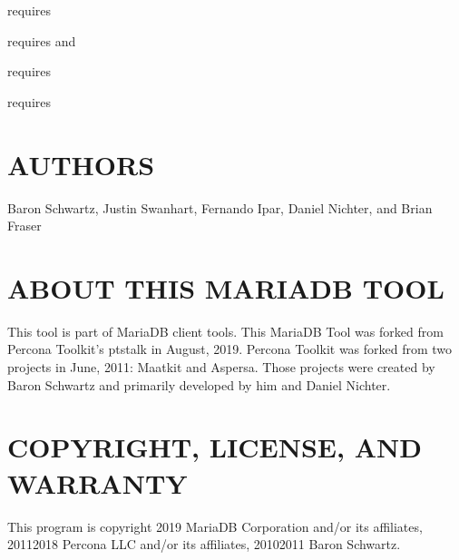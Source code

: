 \documentclass[letterpaper,10pt,english]{sphinxmanual}
\begin{document}
\sphinxAtStartPar
{\hyperref[\detokenize{mariadb-stat:cmdoption-mariadb-stat-collect-gdb}]{}} requires 

\sphinxAtStartPar
{\hyperref[\detokenize{mariadb-stat:cmdoption-mariadb-stat-collect-oprofile}]{}} requires  and 

\sphinxAtStartPar
{\hyperref[\detokenize{mariadb-stat:cmdoption-mariadb-stat-collect-strace}]{}} requires 

\sphinxAtStartPar
{\hyperref[\detokenize{mariadb-stat:cmdoption-mariadb-stat-collect-tcpdump}]{}} requires 


\section{AUTHORS}
\label{\detokenize{mariadb-stat:authors}}
\sphinxAtStartPar
Baron Schwartz, Justin Swanhart, Fernando Ipar, Daniel Nichter,
and Brian Fraser


\section{ABOUT THIS MARIADB TOOL}
\label{\detokenize{mariadb-stat:about-this-mariadb-tool}}
\sphinxAtStartPar
This tool is part of MariaDB client tools. This MariaDB Tool was forked from
Percona Toolkit’s pt\sphinxhyphen{}stalk in August, 2019. Percona Toolkit was forked from two
projects in June, 2011: Maatkit and Aspersa.  Those projects were created by
Baron Schwartz and primarily developed by him and Daniel Nichter.


\section{COPYRIGHT, LICENSE, AND WARRANTY}
\label{\detokenize{mariadb-stat:copyright-license-and-warranty}}
\sphinxAtStartPar
This program is copyright 2019 MariaDB Corporation and/or its affiliates,
2011\sphinxhyphen{}2018 Percona LLC and/or its affiliates, 2010\sphinxhyphen{}2011 Baron Schwartz.
\end{document}
